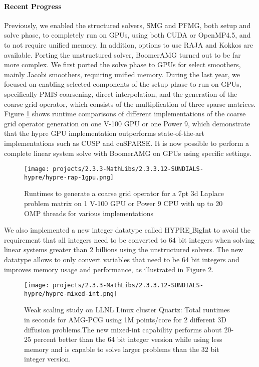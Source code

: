 \paragraph{Recent Progress}

Previously, we enabled the structured solvers, SMG and PFMG\cite{AsFa1996}, both setup and solve phase, to completely run on GPUs, using both CUDA or OpenMP4.5, and to not require unified memory. In addition, options to use RAJA and Kokkos are available.
Porting the unstructured solver, BoomerAMG turned out to be far more complex. We first ported the solve phase to GPUs for select smoothers, mainly Jacobi smoothers, requiring unified memory. During the last year, we focused on enabling selected components of the setup phase to run on GPUs, specifically PMIS coarsening, direct interpolation, and the generation of the coarse grid operator, which consists of the multiplication of three sparse matrices. Figure \ref{fig:rap} shows runtime comparisons of different implementations of the coarse grid operator generation on one V-100 GPU or one Power 9, which demonstrate that the hypre GPU implementation outperforms state-of-the-art implementations such as CUSP and cuSPARSE. It is now possible to perform a complete linear system solve with BoomerAMG on GPUs using specific settings.

\begin{figure}[bth]
\centering
	\texttt{[image: projects/2.3.3-MathLibs/2.3.3.12-SUNDIALS-hypre/hypre-rap-1gpu.png]}
	\caption{\label{fig:rap} Runtimes to generate a coarse grid operator for a 7pt 3d Laplace problem matrix on 1 V-100 GPU or Power 9 CPU with up to 20 OMP threads for various implementations}
\end{figure}

We also implemented a new integer datatype called HYPRE$\_$BigInt to avoid the requirement that all integers need to be converted to 64 bit integers when solving linear systems greater than 2 billions using the unstructured solvers. The new datatype allows to only convert variables that need to be 64 bit integers and improves memory usage and performance, as illustrated in Figure \ref{fig:mixed-int}.

\begin{figure}
\centering
	\texttt{[image: projects/2.3.3-MathLibs/2.3.3.12-SUNDIALS-hypre/hypre-mixed-int.png]}
	\caption{\label{fig:mixed-int} Weak scaling study on LLNL Linux cluster Quartz: Total runtimes in seconds for AMG-PCG using 1M points/core for 2 different 3D diffusion problems.The new mixed-int capability performs about 20-25 percent better than the 64 bit integer version while using less memory and is capable to solve larger problems than the 32 bit integer version.}
\end{figure}

